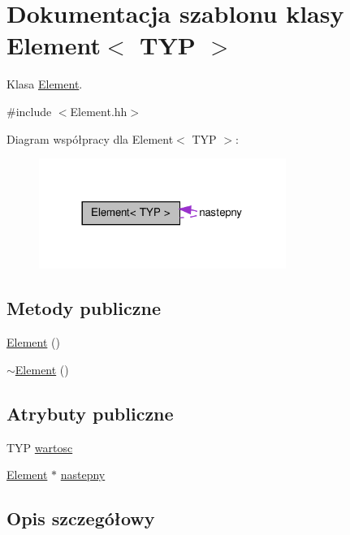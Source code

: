 \hypertarget{class_element}{
\section{Dokumentacja szablonu klasy Element$<$ TYP $>$}
\label{class_element}
}


Klasa \hyperlink{class_element}{Element}.  




{\ttfamily \#include $<$Element.hh$>$}



Diagram współpracy dla Element$<$ TYP $>$:
\nopagebreak
\begin{figure}[H]
\begin{center}
\leavevmode
\includegraphics[width=228pt]{class_element__coll__graph}
\end{center}
\end{figure}
\subsection*{Metody publiczne}
\begin{DoxyCompactItemize}
\item 
\hyperlink{class_element_a92c7c88e8ee87743453ef0af189d169e}{Element} ()
\item 
\hyperlink{class_element_a10ef9400ca8edfe61fe67149d1994a14}{$\sim$Element} ()
\end{DoxyCompactItemize}
\subsection*{Atrybuty publiczne}
\begin{DoxyCompactItemize}
\item 
TYP \hyperlink{class_element_a686c632e35d9fe961d0bf5482e1215fd}{wartosc}
\item 
\hyperlink{class_element}{Element} $\ast$ \hyperlink{class_element_a1af602058c187cccf3f50d0c1a21047d}{nastepny}
\end{DoxyCompactItemize}


\subsection{Opis szczegółowy}
